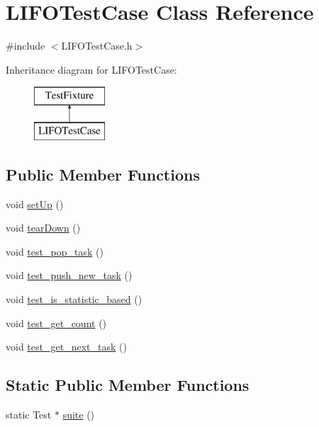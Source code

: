 \hypertarget{class_l_i_f_o_test_case}{}\section{L\+I\+F\+O\+Test\+Case Class Reference}
\label{class_l_i_f_o_test_case}


{\ttfamily \#include $<$L\+I\+F\+O\+Test\+Case.\+h$>$}

Inheritance diagram for L\+I\+F\+O\+Test\+Case\+:\begin{figure}[H]
\begin{center}
\leavevmode
\includegraphics[height=2.000000cm]{class_l_i_f_o_test_case}
\end{center}
\end{figure}
\subsection*{Public Member Functions}
\begin{DoxyCompactItemize}
\item 
void \hyperlink{class_l_i_f_o_test_case_a4a028862ef1179061435da3ca058670e}{set\+Up} ()
\item 
void \hyperlink{class_l_i_f_o_test_case_aa83dba5d549606eba6a54cce4f21c52e}{tear\+Down} ()
\item 
void \hyperlink{class_l_i_f_o_test_case_a99cbee000f0fb1ab639d7bd69faeca06}{test\+\_\+pop\+\_\+task} ()
\item 
void \hyperlink{class_l_i_f_o_test_case_af5481343cc459b8f16618d13314ecdc0}{test\+\_\+push\+\_\+new\+\_\+task} ()
\item 
void \hyperlink{class_l_i_f_o_test_case_aa9073edb510daef4051de7e76b27d6ec}{test\+\_\+is\+\_\+statistic\+\_\+based} ()
\item 
void \hyperlink{class_l_i_f_o_test_case_af7883d3964f2e57802cee6b14be48bb4}{test\+\_\+get\+\_\+count} ()
\item 
void \hyperlink{class_l_i_f_o_test_case_a30a895909a806d006c59bdaae9f1a1c9}{test\+\_\+get\+\_\+next\+\_\+task} ()
\end{DoxyCompactItemize}
\subsection*{Static Public Member Functions}
\begin{DoxyCompactItemize}
\item 
static Test $\ast$ \hyperlink{class_l_i_f_o_test_case_a0bd464ab76c423a53368ebf25577af8e}{suite} ()
\end{DoxyCompactItemize}


